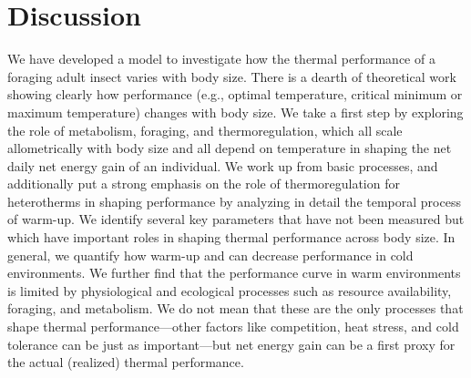 
\section*{Discussion}

We have developed a model to investigate how the thermal performance of a foraging adult insect varies with body size.
There is a dearth of theoretical work showing clearly how performance (e.g., optimal temperature, critical minimum or maximum temperature) changes with body size.
We take a first step by exploring the role of metabolism, foraging, and thermoregulation, which all scale allometrically with body size and all depend on temperature in shaping the net daily net energy gain of an individual.
We work up from basic processes, and additionally put a strong emphasis on the role of thermoregulation for heterotherms in shaping performance by analyzing in detail the temporal process of warm-up.
We identify several key parameters that have not been measured but which have important roles in shaping thermal performance across body size.
In general, we quantify how warm-up and can decrease performance in cold environments.
We further find that the performance curve in warm environments is limited by physiological and ecological processes such as resource availability, foraging, and metabolism.
We do not mean that these are the only processes that shape thermal performance---other factors like competition, heat stress, and cold tolerance can be just as important---but net energy gain can be a first proxy for the actual (realized) thermal performance.

